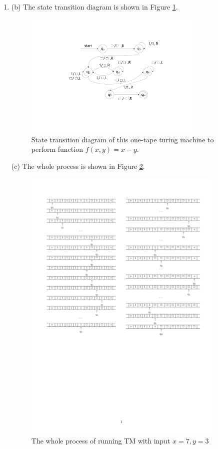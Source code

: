 \documentclass[12pt,a4paper]{article}
\makeatletter
\newtheorem*{solution}{Solution}
\theoremstyle{definition}
\renewenvironment{solution}[1][Solution] {\par\pushQED{\qed}\normalfont\topsep6\p@\@plus6\p@\relax\trivlist\item[\hskip\labelsep\bfseries#1\@addpunct{.}]\ignorespaces}{\popQED\endtrivlist\@endpefalse} \makeatother
\makeatother
\begin{document}
\begin{enumerate}
\begin{solution}
        (b) The state transition diagram is shown in Figure \ref{fig-state}.
        \begin{figure}
            \centering
            \includegraphics[width=0.8\textwidth]{Fig-transition_diagram.pdf}
            \caption{State transition diagram of this one-tape turing machine to perform function $f(x,y)=x-y$.}\label{fig-state}
        \end{figure}

        (c) The whole process is shown in Figure \ref{fig-process}.
        \begin{figure}
            \centering
            \includegraphics[width=0.9\textwidth]{Fig-whole_process.pdf}
            \caption{The whole process of running TM with input $x=7,y=3$}\label{fig-process}
        \end{figure}
    \end{solution}


\end{enumerate}
\end{document}
